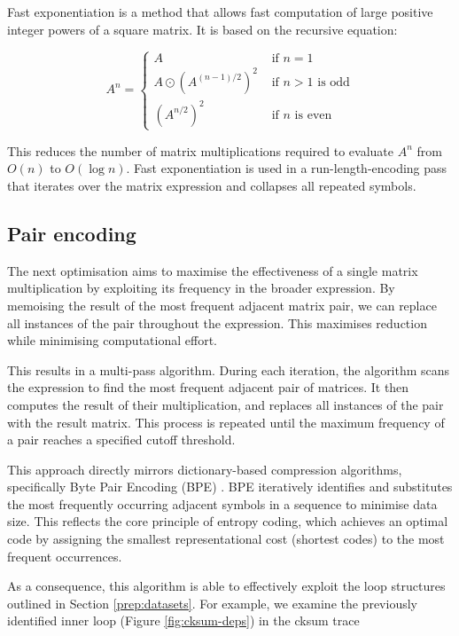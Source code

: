 Fast exponentiation is a method that allows fast computation of large positive integer powers of a square matrix.
It is based on the recursive equation:

$$
A^{n} = \begin{cases}
  A &\text{ if } n=1 \\
  A\odot(A^{(n-1)/2})^{2} &\text{ if } n>1 \text{ is odd}\\
  (A^{n/2})^{2} &\text{ if } n \text{ is even}
\end{cases}
$$

This reduces the number of matrix multiplications required to evaluate $A^n$ from $O(n)$ to $O(\log n)$. Fast exponentiation
is used in a run-length-encoding pass that iterates over the matrix expression and collapses all repeated symbols.

\subsection{Pair encoding} \label{impl:pair-encoding}

The next optimisation aims to maximise the effectiveness of a single matrix multiplication by exploiting its frequency 
in the broader expression. By memoising the result of the most frequent adjacent matrix pair, we can replace all
instances of the pair throughout the expression. This maximises reduction while minimising computational
effort.

This results in a multi-pass algorithm. During each iteration, the algorithm scans the expression to find the most 
frequent adjacent pair of matrices. It then computes the result of their multiplication, and replaces all 
instances of the pair with the result matrix. This process is repeated until the maximum frequency of a pair reaches a
specified cutoff threshold.

This approach directly mirrors dictionary-based compression algorithms, specifically Byte Pair Encoding (BPE) \cite{GageBPE}.
BPE iteratively identifies and substitutes the most frequently occurring adjacent symbols in a sequence to minimise 
data size. This reflects the core principle of entropy coding, which achieves an optimal code by assigning the smallest 
representational cost (shortest codes) to the most frequent occurrences.

As a consequence, this algorithm is able to effectively exploit the loop structures outlined in Section \ref{prep:datasets}.
For example, we examine the previously identified inner loop (Figure \ref{fig:cksum-deps}) in the cksum trace 

